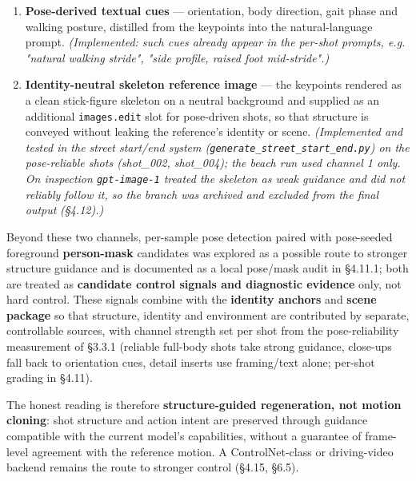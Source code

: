 \documentclass[10pt,twocolumn,letterpaper]{article}
\begin{document}
\begin{enumerate}[leftmargin=1.4em,itemsep=2pt,topsep=2pt]

\item \textbf{Pose-derived textual cues} --- orientation, body direction, gait phase and walking posture, distilled from the keypoints into the natural-language prompt. \emph{(Implemented: such cues already appear in the per-shot prompts, e.g. "natural walking stride", "side profile, raised foot mid-stride".)}

\item \textbf{Identity-neutral skeleton reference image} --- the keypoints rendered as a clean stick-figure skeleton on a neutral background and supplied as an additional \texttt{images.edit} slot for pose-driven shots, so that structure is conveyed without leaking the reference's identity or scene. \emph{(Implemented and tested in the street start/end system (\texttt{generate\_street\_start\_end.py}) on the pose-reliable shots (shot\_002, shot\_004); the beach run used channel 1 only. On inspection \texttt{gpt-image-1} treated the skeleton as weak guidance and did not reliably follow it, so the branch was }\emph{archived and excluded from the final output}\emph{ (\S{}4.12).)}

\end{enumerate}

Beyond these two channels, per-sample pose detection paired with pose-seeded foreground \textbf{person-mask} candidates was explored as a possible route to stronger structure guidance and is documented as a local pose/mask audit in \S{}4.11.1; both are treated as \textbf{candidate control signals and diagnostic evidence} only, not hard control. These signals combine with the \textbf{identity anchors} and \textbf{scene package} so that structure, identity and environment are contributed by separate, controllable sources, with channel strength set per shot from the pose-reliability measurement of \S{}3.3.1 (reliable full-body shots take strong guidance, close-ups fall back to orientation cues, detail inserts use framing/text alone; per-shot grading in \S{}4.11).

The honest reading is therefore \textbf{structure-guided regeneration, not motion cloning}: shot structure and action intent are preserved through guidance compatible with the current model's capabilities, without a guarantee of frame-level agreement with the reference motion. A ControlNet-class or driving-video backend remains the route to stronger control (\S{}4.15, \S{}6.5).
\end{document}
